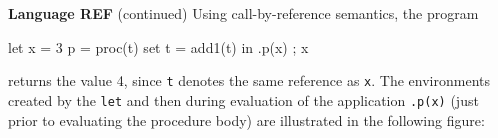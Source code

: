 \begin{minipage}[t]{\sw}
\slidenumber
\LARGE
{\bf Language REF} (continued)\exx
Using call-by-reference semantics,
the program
\begin{qv}
let
  x = 3
  p = proc(t) set t = add1(t)
in
  { .p(x) ; x }
\end{qv}
returns the value 4, since \verb't' denotes
the same reference as \verb'x'.
The environments created by the \verb'let'
and then during evaluation of the application \verb'.p(x)'
(just prior to evaluating the procedure body)
are illustrated in the following figure:
\end{minipage}
\clearpage
